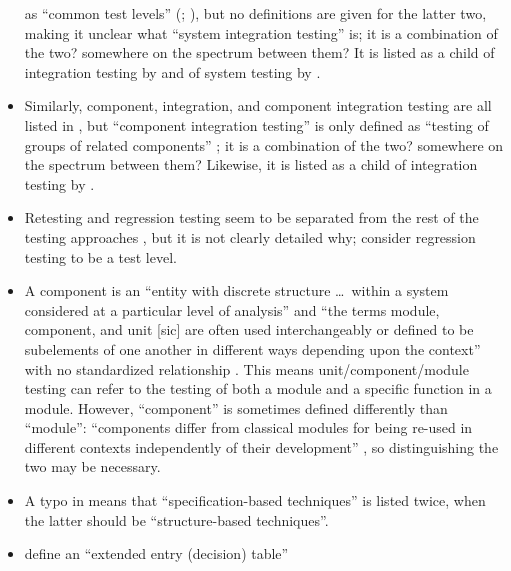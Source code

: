 \begin{itemize}
            as ``common test levels'' (\citealp[p.~12]{IEEE2022};
            \citeyear[p.~6]{IEEE2021}), but no
            definitions are given for the latter two, making it unclear what
            ``system integration testing'' is; it is a combination of the two?
            somewhere on the spectrum between them? It is listed as a child
            of integration testing by \citetISTQB{} and of system testing
            by \citet[p.~23]{Firesmith2015}.
      \item Similarly, component, integration, and component integration
            testing are all listed in \citep{IEEE2017}, but ``component
            integration testing'' is only defined as ``testing of groups of
            related components'' \citep[p.~82]{IEEE2017}; it is a combination of
            the two? somewhere on the spectrum between them? Likewise, it is
            listed as a child of integration testing by \citetISTQB{}.
            \fi
      \item Retesting and regression testing seem to be separated from the rest
            of the testing approaches \citep[p.~23]{IEEE2022}, but it is not
            clearly detailed why; \citet[p.~3]{BarbosaEtAl2006} consider
            regression testing to be a test level.
      \item A component is an ``entity with discrete structure \dots\ within a
            system considered at a particular level of analysis''
            \citep{ISO_IEC2023b} and ``the terms module, component, and unit
                  [sic] are often used interchangeably or defined to be subelements
            of one another in different ways depending upon the context'' with
            no standardized relationship \citep[p.~82]{IEEE2017}. This means
            unit/component/module testing can refer to the testing of both a
            module and a specific function in a module.
            However, ``component'' is sometimes defined differently than
            ``module'': ``components differ from classical modules for being
            re-used in different contexts independently of their development''
            \citep[p.~107]{BaresiAndPezzè2006}, so distinguishing the two
            may be necessary.
            \ifnotpaper
      \item A typo in \citep[Fig.~2]{IEEE2021} means that ``specification-based
            techniques'' is listed twice, when the latter should be
            ``structure-based techniques''.
      \item \citeauthor{IEEE2021} define an ``extended entry (decision) table''

\end{itemize}

